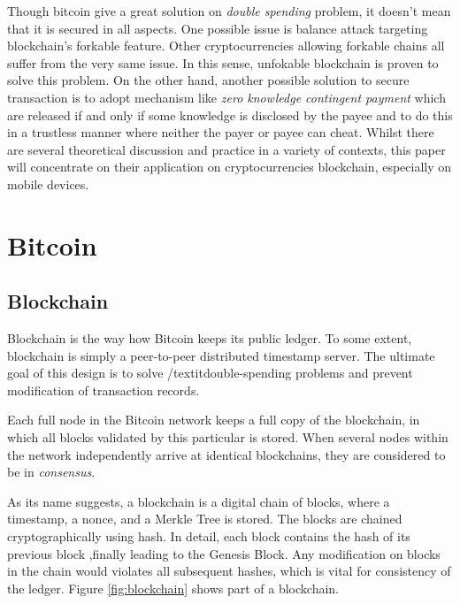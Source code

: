 \documentclass[12pt]{article}
\begin{document}
Though bitcoin give a great solution on \textit{double spending} problem, it doesn't 
mean that it is secured in all aspects. One possible issue is balance attack targeting 
blockchain's forkable feature. Other cryptocurrencies allowing forkable chains all suffer 
from the very same issue. In this sense, unfokable blockchain is proven to solve this problem. 
On the other hand, another possible solution to secure transaction is 
to adopt mechanism like \textit{zero knowledge contingent payment} which are released if 
and only if some knowledge is disclosed by the payee and to do this in a trustless manner 
where neither the payer or payee can cheat. Whilst there are several theoretical discussion 
and practice in a variety of contexts, this paper will concentrate on their application on 
cryptocurrencies blockchain, especially on mobile devices.

\section{Bitcoin}
\label{sec:Blockchain}

\subsection{Blockchain}

Blockchain is the way how Bitcoin keeps its public ledger. To some 
extent, blockchain is simply a peer-to-peer distributed timestamp 
server. The ultimate goal of this design is to solve /textit{double-spending} 
problems and prevent modification of transaction records.

Each full node in the Bitcoin network keeps a full copy of the blockchain, 
in which all blocks validated by this particular is stored. When 
several nodes within the network independently arrive at identical 
blockchains, they are considered to be in \textit{consensus}.

As its name suggests, a blockchain is a digital chain of blocks, where 
a timestamp, a nonce, and a Merkle Tree is stored.  The blocks are chained 
cryptographically using hash. In detail, each block contains the hash of its 
previous block ,finally leading to the Genesis Block. Any modification on 
blocks in the chain would violates all subsequent hashes, which is vital for 
consistency of the ledger. Figure \ref{fig:blockchain} shows part of a blockchain.
\end{document}
